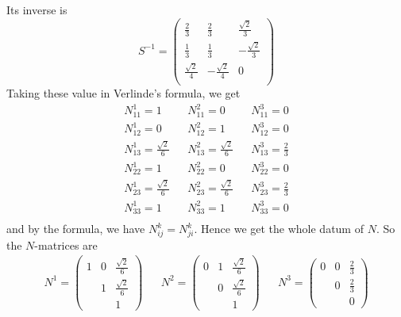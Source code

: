 Its inverse is
\begin{equation}
	S^{-1} = \begin{pmatrix}
	\frac{2}{3} & \frac{2}{3} & \frac{\sqrt{2}}{3} \\
	\frac{1}{3} & \frac{1}{3} & - \frac{\sqrt{2}}{3} \\
	\frac{\sqrt{2}}{4} & -\frac{\sqrt{2}}{4} & 0\\
	\end{pmatrix}
\end{equation}
Taking these value in Verlinde's formula, we get
\begin{equation}
	\begin{aligned}
	N^1_{11} =1 & &N^2_{11}=0 & &N^3_{11}=0 \\
	N^1_{12}= 0&  &N^2_{12}=1 & &N^3_{12} =0 \\
	N^1_{13} = \frac{\sqrt{2}}{6}& & N^2_{13} = \frac{\sqrt{2}}{6}& &N^3_{13}= \frac{2}{3}\\
	N^1_{22} = 1& & N^2_{22}=0 & & N^3_{22}=0\\
	N^1_{23}= \frac{\sqrt{2}}{6}& & N^2_{23}= \frac{\sqrt{2}}{6}& & N^3_{23} = \frac{2}{3}\\
	N^1_{33} = 1 & & N^2_{33}=1 & &N^3_{33}=0\\
	\end{aligned}
\end{equation}
and by the formula, we have $N^k_{ij} = N^k_{ji}$. Hence we get the whole datum of $N$. So the $N$-matrices are
\begin{equation}
	\begin{aligned}
	N^1=\begin{pmatrix}
	1 & 0 & \frac{\sqrt{2}}{6}\\
	& 1 & \frac{\sqrt{2}}{6} \\
	& & 1 
	\end{pmatrix} & & N^2 = \begin{pmatrix}
	0 & 1 & \frac{\sqrt{2}}{6}\\
	& 0 & \frac{\sqrt{2}}{6} \\
	& & 1 
	\end{pmatrix} & &
	N^3=\begin{pmatrix}
	0 & 0 & \frac{2}{3}\\
	& 0 & \frac{2}{3} \\
	& & 0 
	\end{pmatrix}
	\end{aligned}
\end{equation}
